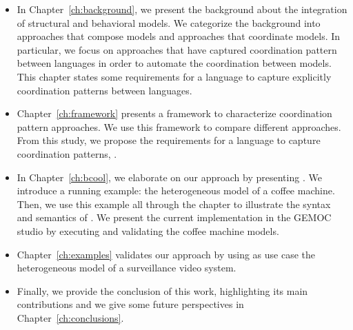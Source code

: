 \begin{itemize}
\item In Chapter~\ref{ch:background}, we present the background about the integration of structural and behavioral models. We categorize the background into approaches that compose models and approaches that coordinate models. In particular, we focus on approaches that have captured coordination pattern between languages in order to automate the coordination between models. This chapter states some requirements for a language to capture explicitly coordination patterns between languages.    

\item Chapter~\ref{ch:framework} presents a framework to characterize coordination pattern approaches. We use this framework to compare different approaches. From this study, we propose the requirements for a language to capture coordination patterns, \ie \bcool.  

\item In Chapter~\ref{ch:bcool}, we elaborate on our approach by presenting \bcool. We introduce a running example: the heterogeneous model of a coffee machine. Then, we use this example all through the chapter to illustrate the syntax and semantics of \bcool. We present the current implementation in the GEMOC studio by executing and validating the coffee machine models. 

\item Chapter~\ref{ch:examples} validates our approach by using as use case the heterogeneous model of a surveillance video system.

\item Finally, we provide the conclusion of this work, highlighting its main contributions and we give some future perspectives in Chapter~\ref{ch:conclusions}.

	
	
\end{itemize}

